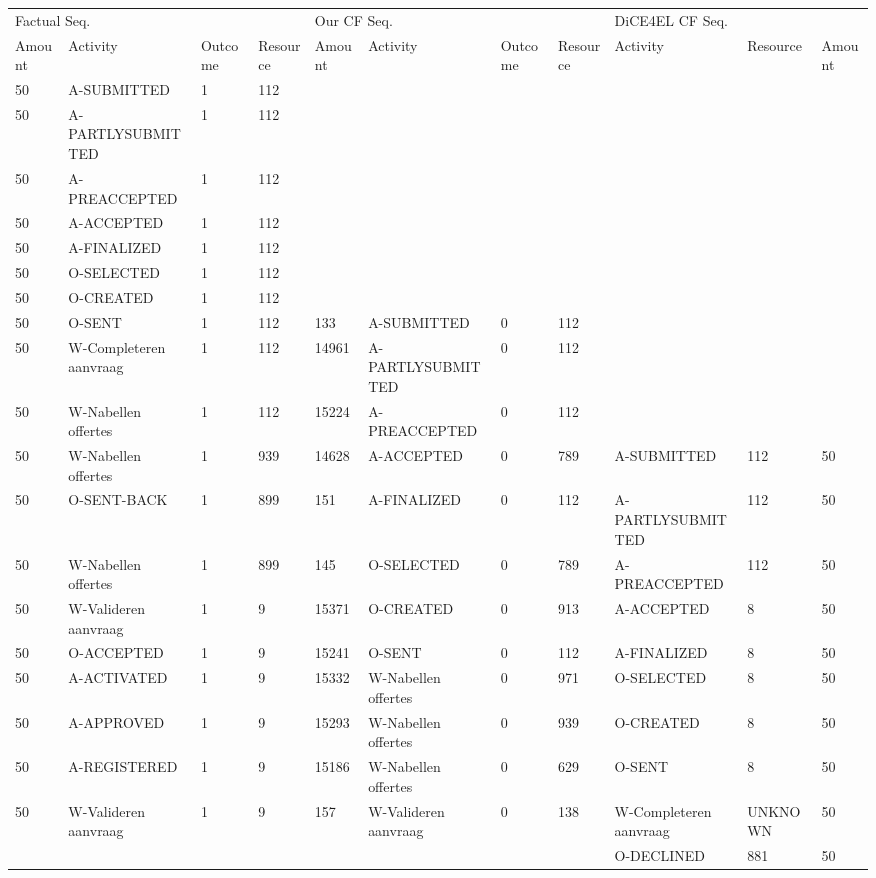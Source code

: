 \begin{tabular}{lllllllllll}
\toprule
\multicolumn{4}{l}{Factual Seq.} & \multicolumn{4}{l}{Our CF Seq.} & \multicolumn{3}{l}{DiCE4EL CF Seq.} \\
Amount & Activity & Outcome & Resource & Amount & Activity & Outcome & Resource & Activity & Resource & Amount \\
\midrule
50 & A-SUBMITTED & 1 & 112 &  &  &  &  &  &  &  \\
50 & A-PARTLYSUBMITTED & 1 & 112 &  &  &  &  &  &  &  \\
50 & A-PREACCEPTED & 1 & 112 &  &  &  &  &  &  &  \\
50 & A-ACCEPTED & 1 & 112 &  &  &  &  &  &  &  \\
50 & A-FINALIZED & 1 & 112 &  &  &  &  &  &  &  \\
50 & O-SELECTED & 1 & 112 &  &  &  &  &  &  &  \\
50 & O-CREATED & 1 & 112 &  &  &  &  &  &  &  \\
50 & O-SENT & 1 & 112 & 133 & A-SUBMITTED & 0 & 112 &  &  &  \\
50 & W-Completeren aanvraag & 1 & 112 & 14961 & A-PARTLYSUBMITTED & 0 & 112 &  &  &  \\
50 & W-Nabellen offertes & 1 & 112 & 15224 & A-PREACCEPTED & 0 & 112 &  &  &  \\
50 & W-Nabellen offertes & 1 & 939 & 14628 & A-ACCEPTED & 0 & 789 & A-SUBMITTED & 112 & 50 \\
50 & O-SENT-BACK & 1 & 899 & 151 & A-FINALIZED & 0 & 112 & A-PARTLYSUBMITTED & 112 & 50 \\
50 & W-Nabellen offertes & 1 & 899 & 145 & O-SELECTED & 0 & 789 & A-PREACCEPTED & 112 & 50 \\
50 & W-Valideren aanvraag & 1 & 9 & 15371 & O-CREATED & 0 & 913 & A-ACCEPTED & 8 & 50 \\
50 & O-ACCEPTED & 1 & 9 & 15241 & O-SENT & 0 & 112 & A-FINALIZED & 8 & 50 \\
50 & A-ACTIVATED & 1 & 9 & 15332 & W-Nabellen offertes & 0 & 971 & O-SELECTED & 8 & 50 \\
50 & A-APPROVED & 1 & 9 & 15293 & W-Nabellen offertes & 0 & 939 & O-CREATED & 8 & 50 \\
50 & A-REGISTERED & 1 & 9 & 15186 & W-Nabellen offertes & 0 & 629 & O-SENT & 8 & 50 \\
50 & W-Valideren aanvraag & 1 & 9 & 157 & W-Valideren aanvraag & 0 & 138 & W-Completeren aanvraag & UNKNOWN & 50 \\
 &  &  &  &  &  &  &  & O-DECLINED & 881 & 50 \\
\bottomrule
\end{tabular}
